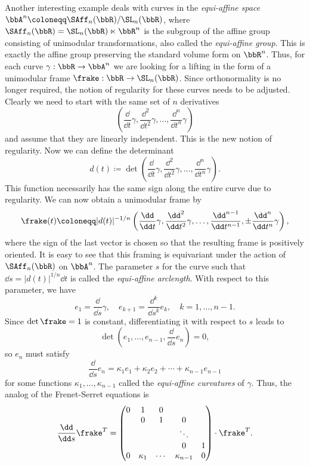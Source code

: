 \begin{example}
    Another interesting example deals with curves in the \emph{equi-affine space} $\bbA^n\coloneqq \SAff_n(\bbR)\slash\SL_n(\bbR)$, where $\SAff_n(\bbR)=\SL_n(\bbR)\ltimes\bbR^n$ is the subgroup of the affine group consisting of unimodular transformations, also called the \emph{equi-affine group}. This is exactly the affine group preserving the standard volume form on $\bbR^n$. Thus, for each curve $\gamma:\bbR\to \bbA^n$ we are looking for a lifting in the form of a unimodular frame $\frake:\bbR\to \SL_n(\bbR)$. Since orthonormality is no longer required, the notion of regularity for these curves needs to be adjusted. Clearly we need to start with the same set of $n$ derivatives
    \[\left(\frac{\dd}{\dd t}\gamma,\frac{\dd^2}{\dd t^2}\gamma,\ldots,\frac{\dd^{n}}{\dd t^{n}}\gamma\right)\]
    and assume that they are linearly independent. This is the new notion of regularity. Now we can define the determinant
    \[d(t)\coloneqq \det\left(\frac{\dd}{\dd t}\gamma,\frac{\dd^2}{\dd t^2}\gamma,\ldots,\frac{\dd^{n}}{\dd t^{n}}\gamma\right).\]
    This function necessarily has the same sign along the entire curve due to regularity. We can now obtain a unimodular frame by 
    \[\frake(t)\coloneqq |d(t)|^{-1/n}\left(\frac{\dd}{\dd t}\gamma,\frac{\dd^2}{\dd t^2}\gamma,\ldots,\frac{\dd^{n-1}}{\dd t^{n-1}},\pm\frac{\dd^{n}}{\dd t^{n}}\gamma\right),\]
    where the sign of the last vector is chosen so that the resulting frame is positively oriented. It is easy to see that this framing is equivariant under the action of $\SAff_n(\bbR)$ on $\bbA^n$. The parameter $s$ for the curve such that $\dd s=|d(t)|^{1/n}\dd t$ is called the \emph{equi-affine arclength}. With respect to this parameter, we have 
    \[e_1=\frac{\dd}{\dd s}\gamma,\quad e_{k+1}=\frac{\dd^k}{\dd s^k} e_k,\quad k=1,\ldots,n-1.\]
    Since $\det\frake=1$ is constant, differentiating it with respect to $s$ leads to 
    \[\det\left(e_1,\ldots,e_{n-1},\frac{\dd}{\dd s}e_n\right)=0,\]
    so $e_n$ must satisfy 
    \[\frac{\dd}{\dd s}e_n=\kappa_1 e_1+\kappa_2 e_2+\cdots+\kappa_{n-1}e_{n-1}\]
    for some functions $\kappa_1,\ldots,\kappa_{n-1}$ called the \emph{equi-affine curvatures} of $\gamma$. Thus, the analog of the Frenet-Serret equations is 
    \[\frac{\dd}{\dd s} \frake^T=\begin{pmatrix}
        0 & 1 & 0 &  & \\
         & 0 & 1 & 0 &     \\
        & &  & \ddots & \\
         & & & 0 & 1\\
        0 & \kappa_1 & \cdots & \kappa_{n-1}& 0
    \end{pmatrix}\cdot\frake^T.\]
\end{example}

